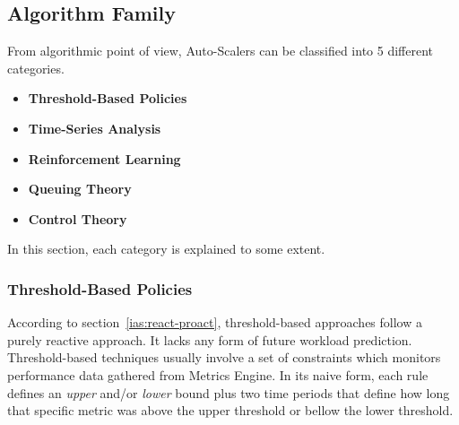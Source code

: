 \clearpage
\subsection{Algorithm Family}
\label{ias:alg-fam}

From algorithmic point of view, Auto-Scalers can be classified into 5 different categories.
\begin{itemize}
    \item \textbf{Threshold-Based Policies}
    \item \textbf{Time-Series Analysis}
    \item \textbf{Reinforcement Learning}
    \item \textbf{Queuing Theory}
    \item \textbf{Control Theory}
\end{itemize}
In this section, each category is explained to some extent.

\subsubsection{Threshold-Based Policies}

According to section~\ref{ias:react-proact}, threshold-based approaches follow a purely  reactive approach. It lacks any form of future workload prediction. Threshold-based techniques usually involve a set of constraints which monitors performance data gathered from Metrics Engine. In its naive form, each rule defines an \emph{upper} and/or \emph{lower} bound plus two time periods that define how long that specific metric was above the upper threshold or bellow the lower threshold.

